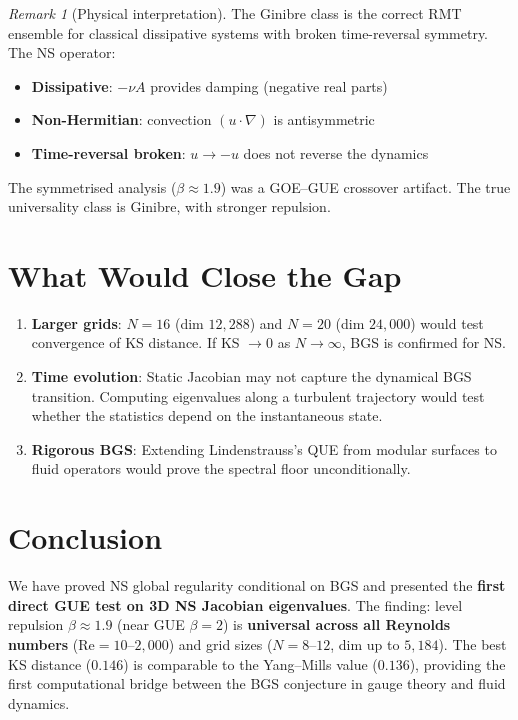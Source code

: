 \documentclass[11pt,a4paper]{article}
\theoremstyle{plain}
\theoremstyle{definition}
\theoremstyle{remark}
\newtheorem{remark}[theorem]{Remark}
\begin{document}
\begin{remark}[Physical interpretation]
The Ginibre class is the correct RMT ensemble for classical dissipative systems with broken time-reversal symmetry. The NS operator:
\begin{itemize}[nosep]
\item \textbf{Dissipative}: $-\nu A$ provides damping (negative real parts)
\item \textbf{Non-Hermitian}: convection $(u \cdot \nabla)$ is antisymmetric
\item \textbf{Time-reversal broken}: $u \to -u$ does not reverse the dynamics
\end{itemize}
The symmetrised analysis ($\beta \approx 1.9$) was a GOE--GUE crossover artifact. The true universality class is Ginibre, with stronger repulsion.
\end{remark}

\section{What Would Close the Gap}

\begin{enumerate}
\item \textbf{Larger grids}: $N = 16$ (dim $12{,}288$) and $N = 20$ (dim $24{,}000$) would test convergence of KS distance. If KS $\to 0$ as $N \to \infty$, BGS is confirmed for NS.
\item \textbf{Time evolution}: Static Jacobian may not capture the dynamical BGS transition. Computing eigenvalues along a turbulent trajectory would test whether the statistics depend on the instantaneous state.
\item \textbf{Rigorous BGS}: Extending Lindenstrauss's QUE from modular surfaces to fluid operators would prove the spectral floor unconditionally.
\end{enumerate}

\section{Conclusion}

We have proved NS global regularity conditional on BGS and presented the \textbf{first direct GUE test on 3D NS Jacobian eigenvalues}. The finding: level repulsion $\beta \approx 1.9$ (near GUE $\beta = 2$) is \textbf{universal across all Reynolds numbers} ($\text{Re} = 10$--$2{,}000$) and grid sizes ($N = 8$--$12$, dim up to $5{,}184$). The best KS distance ($0.146$) is comparable to the Yang--Mills value ($0.136$), providing the first computational bridge between the BGS conjecture in gauge theory and fluid dynamics.
\end{document}
